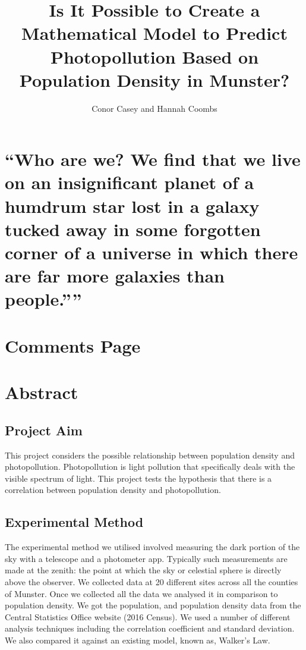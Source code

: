 \documentclass[12pt]{titlepage}
\title{Is It Possible to Create a Mathematical Model to Predict Photopollution Based on Population Density in Munster?}
\author{Conor Casey and Hannah Coombs}
\begin{document}
\maketitle

\clearpage\mbox{}\clearpage


\chapter*{
\centering
    ``Who are we? We find that we live on an insignificant planet of a humdrum star
lost in a galaxy tucked away in some forgotten corner of a universe
in which there are far more galaxies than people.”''
\\[5pt]
}

\chapter*{Comments Page}

\chapter*{Abstract}
\section*{Project Aim} 
This project considers the possible relationship between population density and photopollution. Photopollution is light pollution that specifically deals with the visible spectrum of light. This project tests the hypothesis that there is a correlation between population density and photopollution.  

\section*{Experimental Method} 
The experimental method we utilised involved measuring the dark portion of the sky with a telescope and a photometer app. Typically such measurements are made at the zenith: the point at which the sky or celestial sphere is directly above the observer. We collected data at 20 different sites across all the counties of Munster. Once we collected all the data we analysed it in comparison to population density. We got the population, and population density data from the Central Statistics Office website (2016 Census). We used a number of different analysis techniques including the correlation coefficient and standard deviation. We also compared it against an existing model, known as, Walker's Law.  
\end{document}
